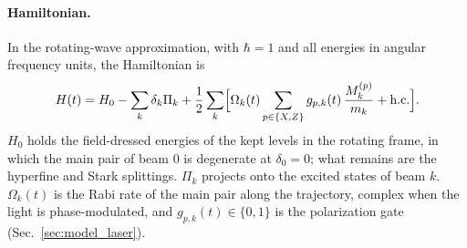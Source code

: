\documentclass[11pt,a4paper,oneside]{report}
\begin{document}
\paragraph{Hamiltonian.} In the rotating-wave approximation, with $\hbar=1$ and all energies in
angular frequency units, the Hamiltonian is
\begin{equation}
  H(t)=H_0-\sum_k\delta_k\Pi_k
  +\frac12\sum_k\Bigl[\Omega_k(t)\sum_{p\in\{X,Z\}}g_{p,k}(t)\,\frac{M^{(p)}_k}{m_k}+\mathrm{h.c.}\Bigr].
  \label{eq:H}
\end{equation}
$H_0$ holds the field-dressed energies of the kept levels in the rotating frame, in which the main
pair of beam 0 is degenerate at $\delta_0=0$; what remains are the hyperfine and Stark splittings.
$\Pi_k$ projects onto the excited states of beam $k$. $\Omega_k(t)$ is the Rabi rate of the main pair
along the trajectory, complex when the light is phase-modulated, and $g_{p,k}(t)\in\{0,1\}$ is the
polarization gate (Sec.~\ref{sec:model_laser}).
\end{document}
